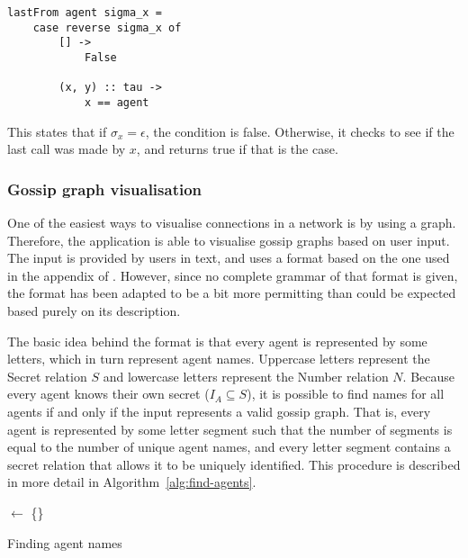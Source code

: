 \begin{lstlisting}[caption={\(\sigma_x = \tau \conc xy\) in Elm.}, label=lst:elm-ex-1]
lastFrom agent sigma_x = 
    case reverse sigma_x of
        [] ->
            False

        (x, y) :: tau ->
            x == agent
\end{lstlisting}

This states that if \(\sigma_x = \epsilon\), the condition is false. 
Otherwise, it checks to see if the last call was made by \(x\), and returns true if that is the case.

\subsubsection{Gossip graph visualisation}\label{sec:gossip-graph-visualisation}

One of the easiest ways to visualise connections in a network is by using a graph.
Therefore, the application is able to visualise gossip graphs based on user input.
The input is provided by users in text, and uses a format based on the one used in the appendix of \textcite{van_ditmarsch_strengthening_2019}.
However, since no complete grammar of that format is given,
the format has been adapted to be a bit more permitting than could be expected based purely on its description.

The basic idea behind the format is that every agent is represented by some letters, which in turn represent agent names.
Uppercase letters represent the Secret relation \(S\) and lowercase letters represent the Number relation \(N\).
Because every agent knows their own secret (\(I_A \subseteq S\)), it is possible to find names for all agents if and only if the input represents a valid gossip graph.
That is, every agent is represented by some letter segment such that the number of segments is equal to the number of unique agent names, and every letter segment contains a secret relation that allows it to be uniquely identified.
This procedure is described in more detail in Algorithm~\ref{alg:find-agents}.

\begin{algorithm*}[p]
    \DontPrintSemicolon

    \Names $\leftarrow$ \{\}\;
    \BlankLine
    \Return{\Names}\;
    \caption{Finding agent names}\label{alg:find-agents}
\end{algorithm*}

